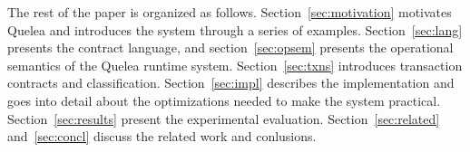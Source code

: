 \documentclass[pldi]{sigplanconf}
\begin{document}
The rest of the paper is organized as follows. Section~\ref{sec:motivation}
motivates Quelea and introduces the system through a series of examples.
Section~\ref{sec:lang} presents the contract language, and
section~\ref{sec:opsem} presents the operational semantics of the Quelea
runtime system. Section~\ref{sec:txns} introduces transaction contracts and
classification. Section~\ref{sec:impl} describes the implementation and goes
into detail about the optimizations needed to make the system practical.
Section~\ref{sec:results} present the experimental evaluation.
Section~\ref{sec:related} and~\ref{sec:concl} discuss the related work and
conlusions.
\end{document}
